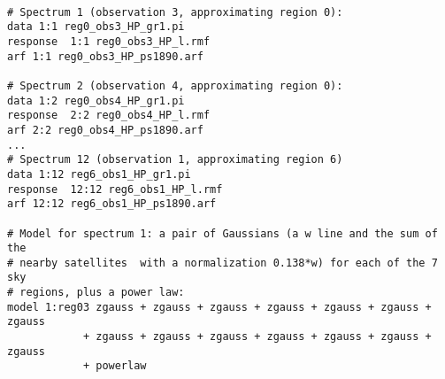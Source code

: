 \begin{lstlisting}[basicstyle=\ttfamily\scriptsize, frame=single]

# Spectrum 1 (observation 3, approximating region 0):
data 1:1 reg0_obs3_HP_gr1.pi
response  1:1 reg0_obs3_HP_l.rmf
arf 1:1 reg0_obs3_HP_ps1890.arf

# Spectrum 2 (observation 4, approximating region 0):
data 1:2 reg0_obs4_HP_gr1.pi
response  2:2 reg0_obs4_HP_l.rmf
arf 2:2 reg0_obs4_HP_ps1890.arf
...
# Spectrum 12 (observation 1, approximating region 6)
data 1:12 reg6_obs1_HP_gr1.pi
response  12:12 reg6_obs1_HP_l.rmf
arf 12:12 reg6_obs1_HP_ps1890.arf

# Model for spectrum 1: a pair of Gaussians (a w line and the sum of the
# nearby satellites  with a normalization 0.138*w) for each of the 7 sky
# regions, plus a power law:
model 1:reg03 zgauss + zgauss + zgauss + zgauss + zgauss + zgauss + zgauss
            + zgauss + zgauss + zgauss + zgauss + zgauss + zgauss + zgauss
            + powerlaw


\end{lstlisting}
